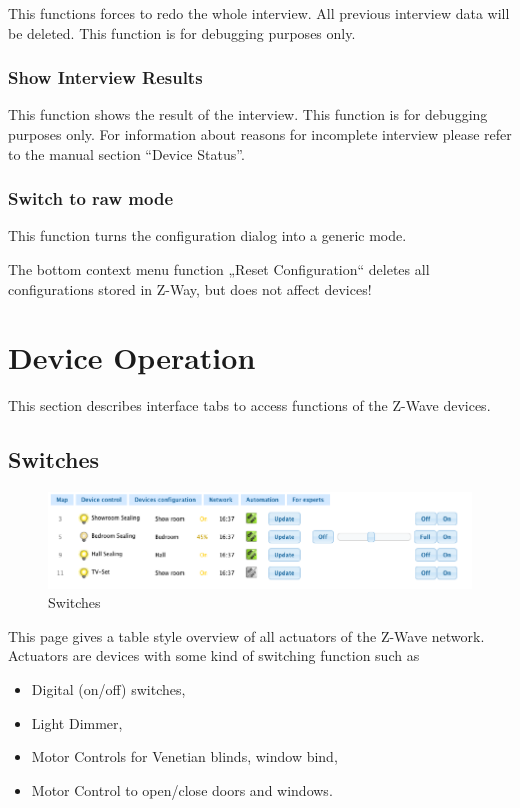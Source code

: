 This functions forces to redo the whole interview. All previous interview data will be deleted. This 
function is for debugging purposes only.

\subsubsection{Show Interview Results} 
This function shows the result of the interview. This function is for debugging purposes only. For 
information about reasons for incomplete interview please refer to the manual section “Device Status”.

\subsubsection{Switch to raw mode}

This function turns the configuration dialog into a generic mode. 

The bottom context menu function  „Reset Configuration“ deletes all configurations stored in Z-Way, 
but does not affect devices!

\section{Device Operation}

This section describes interface tabs to access functions of the Z-Wave devices.

\subsection{Switches}

\begin{figure} 
\begin{center}
\includegraphics[scale=0.8]{pics/switches.png}
\caption{Switches}
\end{center} 
\end{figure} 

This page gives a table style overview of all actuators of the Z-Wave network. Actuators are devices 
with some kind of switching function such as 
\begin{itemize}
\item Digital (on/off) switches, 
\item Light Dimmer, 
\item Motor Controls for Venetian blinds, window bind,
\item Motor Control to open/close doors and windows.
\end{itemize}

